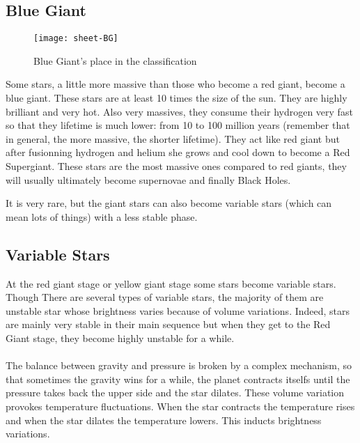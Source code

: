 \documentclass[a4paper, 11pt]{article} %
\begin{document}
\subsection{Blue Giant}


\begin{figure}[h]
\centering
\texttt{[image: sheet-BG]}
\caption{Blue Giant's place in the classification}
\end{figure}
 
Some stars, a little more massive than those who become a red giant, become a blue giant. These stars are at least 10 times the size of the sun. They are highly brilliant and very hot. Also very massives, they consume their hydrogen very fast so that they lifetime is much lower: from 10 to 100 million years (remember that in general, the more massive, the shorter lifetime). They act like red giant but after fusionning hydrogen and helium she grows and cool down to become a Red Supergiant. These stars are the most massive ones compared to red giants, they will usually ultimately become supernovae and finally Black Holes. 

It is very rare, but the giant stars can also become variable stars (which can mean lots of things) with a less stable phase.




\subsection{Variable Stars}

At the red giant stage or yellow giant stage some stars become variable stars. Though There are several types of variable stars, the majority of them are unstable star whose brightness varies because of volume variations. Indeed, stars are mainly very stable in their main sequence but when they get to the Red Giant stage, they become highly unstable for a while. 





\paragraph*{}
The balance between gravity and pressure is broken by a complex mechanism, so that sometimes the gravity wins for a while, the planet contracts itselfs until the pressure takes back the upper side and the star dilates. These volume variation provokes temperature fluctuations. When the star contracts the temperature rises and when the star dilates the temperature lowers. This inducts brightness variations. 
\end{document}
